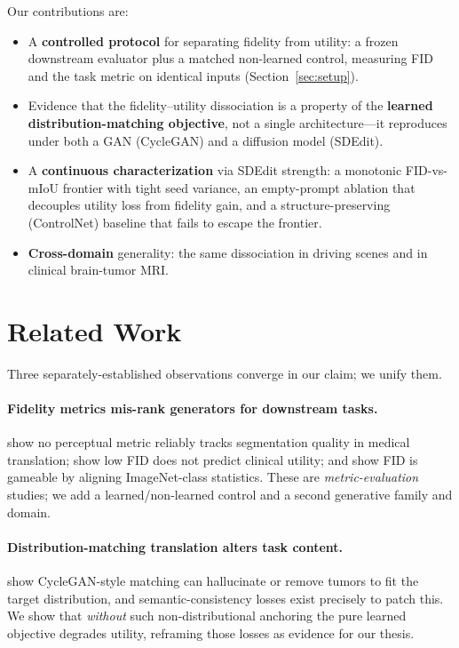 Our contributions are:
\begin{itemize}
  \item A \textbf{controlled protocol} for separating fidelity from utility: a
  frozen downstream evaluator plus a matched non-learned control, measuring FID
  and the task metric on identical inputs (Section~\ref{sec:setup}).
  \item Evidence that the fidelity--utility dissociation is a property of the
  \textbf{learned distribution-matching objective}, not a single architecture---it
  reproduces under both a GAN (CycleGAN) and a diffusion model (SDEdit).
  \item A \textbf{continuous characterization} via SDEdit strength: a monotonic
  FID-vs-mIoU frontier with tight seed variance, an empty-prompt ablation that
  decouples utility loss from fidelity gain, and a structure-preserving
  (ControlNet) baseline that fails to escape the frontier.
  \item \textbf{Cross-domain} generality: the same dissociation in driving scenes
  and in clinical brain-tumor MRI.
\end{itemize}

\section{Related Work}
Three separately-established observations converge in our claim; we unify them.

\paragraph{Fidelity metrics mis-rank generators for downstream tasks.}
\citet{konz2024rethinking} show no perceptual metric reliably tracks segmentation
quality in medical translation; \citet{dutt2025chexgenbench} show low FID does not
predict clinical utility; and \citet{kynkaanniemi2023role} show FID is gameable by
aligning ImageNet-class statistics. These are \emph{metric-evaluation} studies; we
add a learned/non-learned control and a second generative family and domain.

\paragraph{Distribution-matching translation alters task content.}
\citet{cohen2018distribution} show CycleGAN-style matching can hallucinate or
remove tumors to fit the target distribution, and semantic-consistency losses
\citep{hoffman2018cycada,peng2023diffusion} exist precisely to patch this. We show
that \emph{without} such non-distributional anchoring the pure learned objective
degrades utility, reframing those losses as evidence for our thesis.

